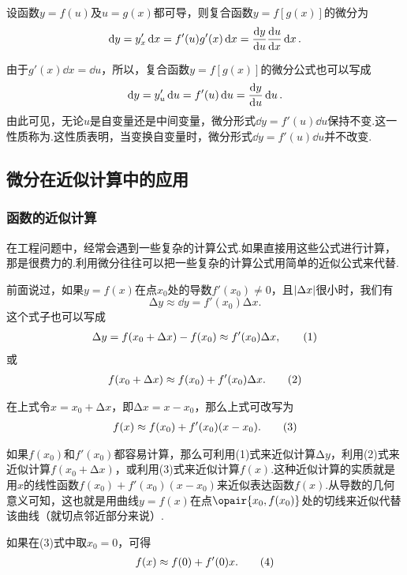 \begin{theorem}[复合函数的微分法则]
设函数\(y=f(u)\)及\(u=g(x)\)都可导，则复合函数\(y=f[g(x)]\)的微分为\[
\dd{y}=y'_x\dd{x}=f'(u)g'(x)\dd{x}=\dv{y}{u}\dv{u}{x}\dd{x}.
\]

由于\(g'(x)\dd{x}=\dd{u}\)，所以，复合函数\(y=f[g(x)]\)的微分公式也可以写成\[
\dd{y}=y'_u\dd{u}=f'(u)\dd{u}=\dv{y}{u}\dd{u}.
\]由此可见，无论\(u\)是自变量还是中间变量，微分形式\(\dd{y}=f'(u)\dd{u}\)保持不变.这一性质称为.这性质表明，当变换自变量时，微分形式\(\dd{y}=f'(u)\dd{u}\)并不改变.
\end{theorem}

\subsection{微分在近似计算中的应用}
\subsubsection{函数的近似计算}
在工程问题中，经常会遇到一些复杂的计算公式.如果直接用这些公式进行计算，那是很费力的.利用微分往往可以把一些复杂的计算公式用简单的近似公式来代替.

前面说过，如果\(y=f(x)\)在点\(x_0\)处的导数\(f'(x_0)\neq0\)，且\(\abs{\Delta x}\)很小时，我们有\[
\increment y \approx\dd{y} = f'(x_0) \increment x.
\]这个式子也可以写成\begin{gather}
\increment y = f(x_0 + \increment x) - f(x_0) \approx f'(x_0) \increment x, \tag1
\end{gather}或\begin{gather}
f(x_0 + \increment x) \approx f(x_0) + f'(x_0) \increment x. \tag2
\end{gather}

在上式令\(x = x_0 + \increment x\)，即\(\increment x = x - x_0\)，那么上式可改写为\begin{gather}
f(x) \approx f(x_0) + f'(x_0) (x - x_0). \tag3
\end{gather}

如果\(f(x_0)\)和\(f'(x_0)\)都容易计算，那么可利用(1)式来近似计算\(\increment y\)，利用(2)式来近似计算\(f(x_0 + \increment x)\)，或利用(3)式来近似计算\(f(x)\).这种近似计算的实质就是用\(x\)的线性函数\(f(x_0) + f'(x_0) (x - x_0)\)来近似表达函数\(f(x)\).从导数的几何意义可知，这也就是用曲线\(y=f(x)\)在点\(\opair{x_0,f(x_0)}\)处的切线来近似代替该曲线（就切点邻近部分来说）.

如果在(3)式中取\(x_0 = 0\)，可得\begin{gather}
f(x) \approx f(0) + f'(0) x. \tag4
\end{gather}

